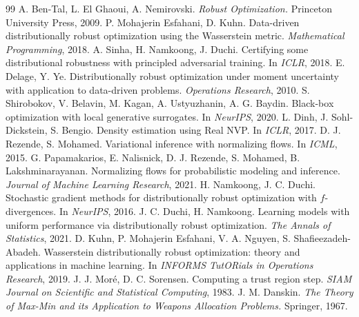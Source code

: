 \documentclass[11pt]{article}
\begin{document}
\begin{thebibliography}{99}
 A. Ben-Tal, L. El Ghaoui, A. Nemirovski. \emph{Robust Optimization.} Princeton University Press, 2009.
 P. Mohajerin Esfahani, D. Kuhn. Data-driven distributionally robust optimization using the Wasserstein metric. \emph{Mathematical Programming}, 2018.
 A. Sinha, H. Namkoong, J. Duchi. Certifying some distributional robustness with principled adversarial training. In \emph{ICLR}, 2018.
 E. Delage, Y. Ye. Distributionally robust optimization under moment uncertainty with application to data-driven problems. \emph{Operations Research}, 2010.
 S. Shirobokov, V. Belavin, M. Kagan, A. Ustyuzhanin, A. G. Baydin. Black-box optimization with local generative surrogates. In \emph{NeurIPS}, 2020.
 L. Dinh, J. Sohl-Dickstein, S. Bengio. Density estimation using Real NVP. In \emph{ICLR}, 2017.
 D. J. Rezende, S. Mohamed. Variational inference with normalizing flows. In \emph{ICML}, 2015.
 G. Papamakarios, E. Nalisnick, D. J. Rezende, S. Mohamed, B. Lakshminarayanan. Normalizing flows for probabilistic modeling and inference. \emph{Journal of Machine Learning Research}, 2021.
 H. Namkoong, J. C. Duchi. Stochastic gradient methods for distributionally robust optimization with $f$-divergences. In \emph{NeurIPS}, 2016.
 J. C. Duchi, H. Namkoong. Learning models with uniform performance via distributionally robust optimization. \emph{The Annals of Statistics}, 2021.
 D. Kuhn, P. Mohajerin Esfahani, V. A. Nguyen, S. Shafieezadeh-Abadeh. Wasserstein distributionally robust optimization: theory and applications in machine learning. In \emph{INFORMS TutORials in Operations Research}, 2019.
 J. J. Mor\'e, D. C. Sorensen. Computing a trust region step. \emph{SIAM Journal on Scientific and Statistical Computing}, 1983.
 J. M. Danskin. \emph{The Theory of Max-Min and its Application to Weapons Allocation Problems.} Springer, 1967.
\end{thebibliography}
\end{document}

